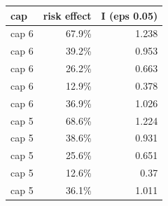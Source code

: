 \begin{tabular}{lrr}
\toprule
cap & risk effect & I (eps 0.05) \\
\midrule
cap 6 & 67.9\% & 1.238 \\
cap 6 & 39.2\% & 0.953 \\
cap 6 & 26.2\% & 0.663 \\
cap 6 & 12.9\% & 0.378 \\
cap 6 & 36.9\% & 1.026 \\
cap 5 & 68.6\% & 1.224 \\
cap 5 & 38.6\% & 0.931 \\
cap 5 & 25.6\% & 0.651 \\
cap 5 & 12.6\% & 0.37 \\
cap 5 & 36.1\% & 1.011 \\
\bottomrule
\end{tabular}
